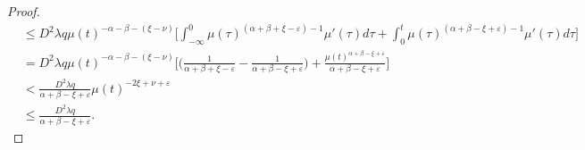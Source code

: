 \documentclass[9pt]{amsart}
\numberwithin{equation}{section}
\numberwithin{lemma}{section}
\begin{document}
\begin{proof}
\begin{equation*}
\begin{split}
        &\leq D^2\lambda q \mu(t)^{-\alpha-\beta-(\xi-\nu)} \Big[\int_{-\infty}^{0}\mu(\tau)^{(\alpha+\beta+\xi-\varepsilon)-1}\mu'(\tau)d\tau + \int_{0}^{t}\mu(\tau)^{(\alpha+\beta-\xi+\varepsilon)-1}\mu'(\tau)d\tau\Big]\\
        &= D^2\lambda q \mu(t)^{-\alpha-\beta-(\xi-\nu)}\Big[\Big(\frac{1}{\alpha+\beta+\xi-\varepsilon}-\frac{1}{\alpha+\beta-\xi+\varepsilon}\Big)+\frac{\mu(t)^{\alpha+\beta-\xi+\varepsilon}}{\alpha+\beta-\xi+\varepsilon}\Big]\\
        &< \frac{D^2\lambda q}{\alpha+\beta-\xi+\varepsilon}\mu(t)^{-2\xi+\nu+\varepsilon}\\
        &\leq \frac{D^2\lambda q}{\alpha+\beta-\xi+\varepsilon}.
    \end{split}
\end{equation*}


\end{proof}
\end{document}
